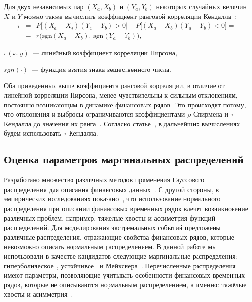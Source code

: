 Для двух независимых пар $(X_a, X_b)$ и $(Y_a, Y_b)$ некоторых случайных величин $X$ и $Y$ можно также вычислить коэффициент ранговой корреляции Кендалла~\cite{Kendall1970}:
\begin{eqnarray}\label{kendall}
\tau &=& P\big[(X_a-X_b)(Y_a-Y_b)>0\big]-P\big[(X_a-X_b)(Y_a-Y_b)<0\big] = \\ 
&=& r\big(\text{sgn}(X_a-X_b),~\text{sgn}(Y_a-Y_b)\big),\nonumber
\end{eqnarray}
\begin{where}
    \item $r(x,y)$~--- линейный коэффициент корреляции Пирсона,
    \item $sgn(\cdot)$~--- функция взятия знака вещественного числа.
\end{where}

Оба приведенных выше коэффициента ранговой корреляции, в отличие от линейной корреляции Пирсона, менее чувствительны к сильным отклонениям, постоянно возникающим в динамике финансовых рядов.
Это происходит потому, что отклонения и выбросы ограничиваются коэффициентами $\rho$ Спирмена и $\tau$ Кендалла до значения их ранга~\cite{Ane2003}.
Согласно статье~\cite{Dissmann2013}, в дальнейших вычислениях будем использовать $\tau$ Кендалла.

\subsection{Оценка параметров маргинальных распределений}
\label{methodology:marginals}

Разработано множество различных методов применения Гауссового распределения для описания финансовых данных~\cite{Json1949}. 
С другой стороны, в эмпирических исследованиях показано~\cite{Limp2011, Rachev2005, Wilmott2007}, что использование нормального распределения при описании финансовых временных рядов влечет возникновение различных проблем, например, тяжелые хвосты и ассиметрия функций распределений.
Для моделирования экстремальных событий предложены различные распределения, отражающие свойства финансовых рядов, которые невозможно описать нормальным распределением.
В данной работе мы использовали в качестве кандидатов следующие маргинальные распределения: гиперболическое~\cite{Barndoff1983}, устойчивое~\cite{Nolan2009, Rachev2005, Stoyanov2013} и Мейкснера~\cite{Schoutens2002}. Перечисленные распределения имеют параметры, позволяющие учитывать особенности  финансовых временных рядов, которые не описываются нормальным распределением, а именно: тяжёлые хвосты и асимметрия~\cite{Stoyanov2013}. 

